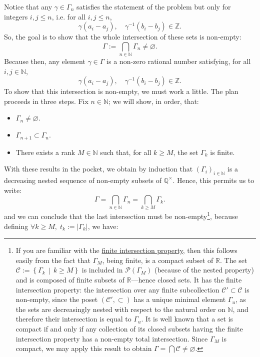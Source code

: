 \documentclass[11pt, a4paper, oneside]{article}
\theoremstyle{remark}
\theoremstyle{lemma}
\begin{document}
Notice that any \( \gamma \in \Gamma_n \) satisfies the statement of the problem but only for integers \( i, j \leq n \), i.e. for all \( i, j \leq n \),
\[
\gamma\left( a_i - a_j \right), \quad \gamma^{-1}\left( b_i - b_j \right) \in \mathbb{Z}.
\]
So, the goal is to show that the whole intersection of these sets is non-empty:
\[
\Gamma := \bigcap_{n \in \mathbb{N}} \Gamma_n \neq \varnothing.
\]
Because then, any element \( \gamma \in \Gamma \) is a non-zero rational number satisfying, for all \( i, j \in \mathbb{N} \),
\[
\gamma\left( a_i - a_j \right), \quad \gamma^{-1}\left( b_i - b_j \right) \in \mathbb{Z}.
\]
To show that this intersection is non-empty, we must work a little. The plan proceeds in three steps. Fix \( n \in \mathbb{N} \); we will show, in order, that:
\begin{itemize}
    \item \( \Gamma_n \neq \varnothing \).
    \item \( \Gamma_{n+1} \subset \Gamma_n \).
    \item There exists a rank \( M \in \mathbb{N} \) such that, for all \( k \geq M \), the set \( \Gamma_k \) is finite.
\end{itemize}
With these results in the pocket, we obtain by induction that \( \left( \Gamma_i \right)_{i \in \mathbb{N}} \) is a decreasing nested sequence of non-empty subsets of \( \mathbb{Q}^{\times} \). Hence, this permits us to write:
\[
\Gamma = \bigcap_{n \in \mathbb{N}} \Gamma_n = \bigcap_{k \geq M} \Gamma_k.
\]
and we can conclude that the last intersection must be non-empty\footnote{If you are familiar with the \href{https://en.wikipedia.org/wiki/Finite_intersection_property}{finite intersection property}, then this follows easily from the fact that \( \Gamma_M \), being finite, is a compact subset of \( \mathbb{R} \). The set \( \mathcal{C} := \left\{ \Gamma_k \,\middle|\, k \geq M \right\} \) is included in \( \mathscr{P} \left( \Gamma_M \right) \) (because of the nested property) and is composed of finite subsets of \( \mathbb{R} \)—hence closed sets. It has the finite intersection property: the intersection over any finite subcollection \( \mathcal{C}' \subset \mathcal{C} \) is non-empty, since the poset \( \left( \mathcal{C}', \subset \right) \) has a unique minimal element \( \Gamma_u \), as the sets are decreasingly nested with respect to the natural order on \( \mathbb{N} \), and therefore their intersection is equal to \( \Gamma_u \). It is well known that a set is compact if and only if any collection of its closed subsets having the finite intersection property has a non-empty total intersection. Since \( \Gamma_M \) is compact, we may apply this result to obtain \( \Gamma = \bigcap \mathcal{C} \neq \varnothing \).}, because defining \( \forall k \geq M,\; t_k := \left| \Gamma_k \right| \), we have:
\end{document}
